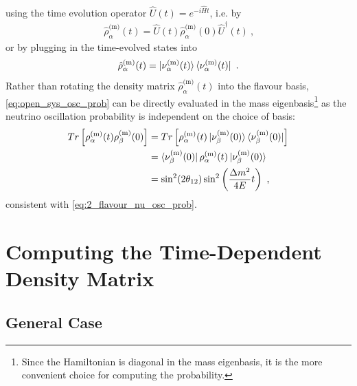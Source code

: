 %
using the time evolution operator $\hat{U}(t)=e^{-i\hat{H}t}$, i.e. by 
%
\begin{align} \label{eq:rho_alpha_time_evolution}
    \hat{\rho}^\text{(m)}_\alpha(t) = \hat{U}(t) \hat{\rho}^\text{(m)}_\alpha(0) \hat{U}^\dagger(t) \ \text{,}
\end{align}
%
or by plugging in the time-evolved states into
%
\begin{align} \label{eq:rho_alpha_t_eq}
    \hat{\rho}^\text{(m)}_\alpha(t) = \ket{\nu^\text{(m)}_\alpha(t)} \bra{\nu^\text{(m)}_\alpha(t)} \ .
\end{align}
%
Rather than rotating the density matrix $\hat{\rho}^\text{(m)}_\alpha(t)$ into the flavour basis, \cref{eq:open_sys_osc_prob} can be directly evaluated in the mass eigenbasis\footnote{Since the Hamiltonian is diagonal in the mass eigenbasis, it is the more convenient choice for computing the probability.} as the neutrino oscillation probability is independent on the choice of basis:
%
\begin{align} \label{eq:2_flavour_open_qs_osc_prob}
    Tr\left[\rho^\text{(m)}_\alpha(t)\rho^\text{(m)}_\beta(0)\right]
    &=
    Tr\left[\rho^\text{(m)}_\alpha(t) \ket{\nu^\text{(m)}_\beta(0)} \bra{\nu^\text{(m)}_\beta(0)} \right] \\
    &=
    \bra{\nu^\text{(m)}_\beta(0)} \rho^\text{(m)}_\alpha(t) \ket{\nu^\text{(m)}_\beta(0)} \\
    &=
    \sin^2(2\theta_{12}) \sin^2\left(\frac{\Delta m ^2}{4E}t\right)
    \ \text{,}
\end{align}
%
consistent with \cref{eq:2_flavour_nu_osc_prob}.

\section{Computing the Time-Dependent Density Matrix}

\subsection{General Case}



